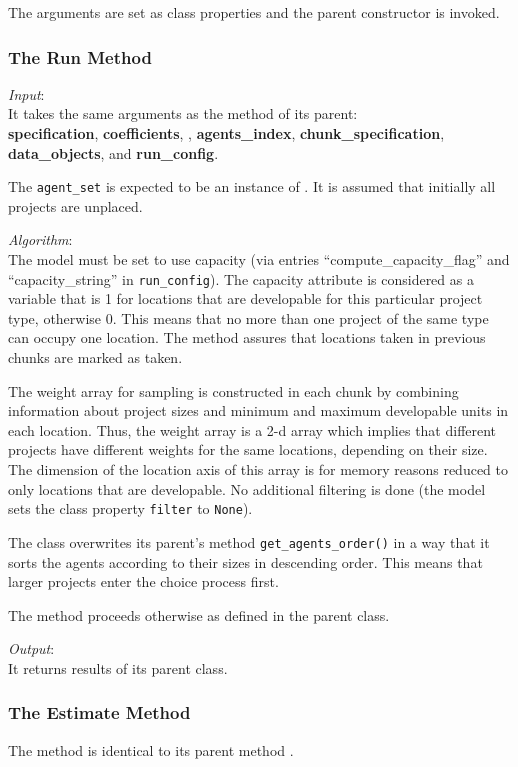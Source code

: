 The arguments are set as class properties and the parent constructor is invoked.

\subsubsection{The Run Method}
%
{\it Input}:\\[1mm]
It takes the same arguments as the  method of its parent: \\
{\bf specification}, {\bf coefficients}, , {\bf agents_index},
{\bf chunk_specification}, {\bf data_objects}, and {\bf run_config}.

The \verb|agent_set| is expected to be an instance of
. It is assumed that initially all projects are
unplaced.

{\it Algorithm}:\\[1mm]
The model \modelsindex must be set to use capacity (via entries ``compute_capacity_flag''
and ``capacity_string'' in \verb|run_config|).  The capacity attribute \attributesindex is
considered as a variable \variablesindex that is 1 for locations that are developable for this
particular project type, otherwise 0. This means that no more than one project
of the same type can occupy one location. The method
 assures that locations taken in previous
chunks are marked as taken.

The weight array for sampling is constructed in each chunk by combining
information about project sizes and minimum and maximum developable units in
each location.  Thus, the weight array is a 2-d array which implies that
different projects have different weights for the same locations, depending on
their size. The dimension of the location axis of this array is for memory
reasons reduced to only locations that are developable. No additional
filtering is done (the model \modelsindex sets the class property \verb|filter| to
\verb|None|).

The class overwrites its parent's method \verb|get_agents_order()| in a way that it
sorts the agents according to their sizes in descending order. This means that
larger projects enter the choice process first.

The  method proceeds otherwise as defined in the parent class.

{\it Output}:~\\[1mm]
It returns results of its parent class.

\subsubsection{The Estimate Method}
%
The  method is identical to its parent method
.


